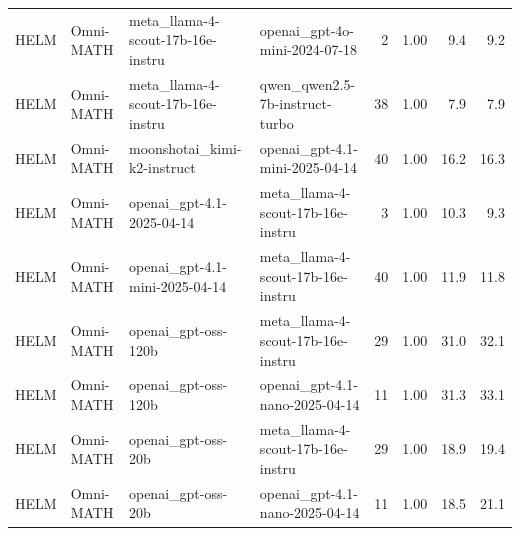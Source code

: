 \begin{longtable}{lp{2.4cm}p{3.5cm}p{3.5cm}rrrr}
HELM & Omni-MATH & meta\_\allowbreak llama-4-scout-17b-16e-instru~ & openai\_\allowbreak gpt-4o-mini-2024-07-18 & 2 & 1.00 & 9.4 & 9.2 \\
HELM & Omni-MATH & meta\_\allowbreak llama-4-scout-17b-16e-instru~ & qwen\_\allowbreak qwen2.5-7b-instruct-turbo & 38 & 1.00 & 7.9 & 7.9 \\
HELM & Omni-MATH & moonshotai\_\allowbreak kimi-k2-instruct & openai\_\allowbreak gpt-4.1-mini-2025-04-14 & 40 & 1.00 & 16.2 & 16.3 \\
HELM & Omni-MATH & openai\_\allowbreak gpt-4.1-2025-04-14 & meta\_\allowbreak llama-4-scout-17b-16e-instru~ & 3 & 1.00 & 10.3 & 9.3 \\
HELM & Omni-MATH & openai\_\allowbreak gpt-4.1-mini-2025-04-14 & meta\_\allowbreak llama-4-scout-17b-16e-instru~ & 40 & 1.00 & 11.9 & 11.8 \\
HELM & Omni-MATH & openai\_\allowbreak gpt-oss-120b & meta\_\allowbreak llama-4-scout-17b-16e-instru~ & 29 & 1.00 & 31.0 & 32.1 \\
HELM & Omni-MATH & openai\_\allowbreak gpt-oss-120b & openai\_\allowbreak gpt-4.1-nano-2025-04-14 & 11 & 1.00 & 31.3 & 33.1 \\
HELM & Omni-MATH & openai\_\allowbreak gpt-oss-20b & meta\_\allowbreak llama-4-scout-17b-16e-instru~ & 29 & 1.00 & 18.9 & 19.4 \\
HELM & Omni-MATH & openai\_\allowbreak gpt-oss-20b & openai\_\allowbreak gpt-4.1-nano-2025-04-14 & 11 & 1.00 & 18.5 & 21.1 \\
\end{longtable}
